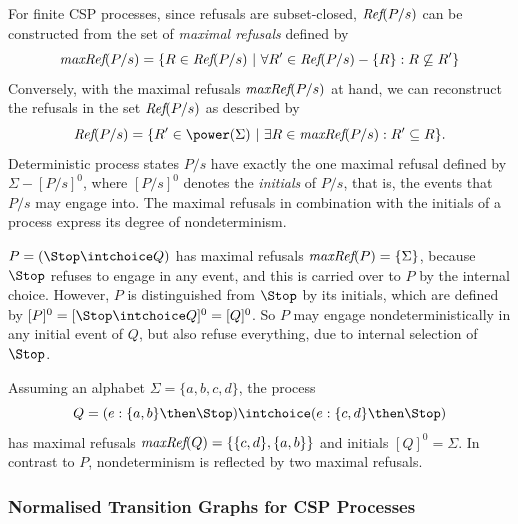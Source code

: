 For finite CSP processes, since refusals are
subset-closed, $\text{\it Ref}(P/s)$ can be constructed from the set of \emph{maximal
refusals} defined by
%
\begin{equation}
\text{\it maxRef}(P/s) = \{ R \in\text{\it Ref}(P/s)~|~\forall R'\in \text{\it Ref}(P/s) - \{ R\}: R \not\subseteq R'\}
\end{equation}
%
Conversely, with the maximal refusals $\text{\it maxRef}(P/s)$ at hand, we can
reconstruct the refusals in the set $\text{\it Ref}(P/s)$ as described by
%
\begin{equation}
\refs(P/s) = \{ R'\in\power(\Sigma)~|~\exists R\in \maxrefs(P/s): R'\subseteq R \}.
\end{equation}
%
Deterministic process states $P/s$ have exactly the one maximal refusal
defined by $\Sigma-[P/s]^0$, where $[P/s]^0$ denotes the \emph{initials} of
$P/s$, that is, the events that $P/s$ may engage into. The maximal refusals
in combination with the initials of a process express its degree of
nondeterminism.
%
\begin{example}
\label{ex:nondetdegree} $P = (\Stop \intchoice Q)$ has maximal refusals
$\text{\it maxRef}(P) = \{ \Sigma \}$, because $\Stop$ refuses to engage in any event,
and this is carried over to $P$ by the internal choice. However, $P$ is
distinguished from $\Stop$ by its initials, which are defined by $[P]^0 = [
\Stop \intchoice Q]^0 = [Q]^0$. So $P$ may engage nondeterministically in any
initial event of $Q$, but also refuse everything, due to internal selection
of $\Stop$.

Assuming an alphabet $\Sigma = \{a,b,c,d\}$, the process
%
$$Q = (e:\{a,b\} \then \Stop) \intchoice (e:\{c,d\} \then \Stop)$$
%
has maximal refusals $\text{\it maxRef}(Q) = \{ \{c,d\}, \{a,b\} \}$ and initials
$[Q]^0=\Sigma$. In contrast to $P$, nondeterminism is reflected by
two maximal refusals. \xbox
\end{example}



\subsubsection*{Normalised Transition Graphs for CSP Processes}
\label{sec:ntg}

